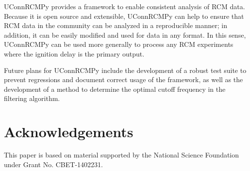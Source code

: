 \documentclass[12pt]{../ussci}
\begin{document}
UConnRCMPy provides a framework to enable consistent analysis of RCM
data. Because it is open source and extensible, UConnRCMPy can help to
ensure that RCM data in the community can be analyzed in a reproducible
manner; in addition, it can be easily modified and used for data in any
format. In this sense, UConnRCMPy can be used more generally to process
any RCM experiments where the ignition delay is the primary output.

Future plans for UConnRCMPy include the development of a robust test
suite to prevent regressions and document correct usage of the
framework, as well as the development of a method to determine the
optimal cutoff frequency in the filtering algorithm.

\section{Acknowledgements}\label{acknowledgements}

This paper is based on material supported by the National Science
Foundation under Grant No. CBET-1402231.

\printbibliography
\end{document}
